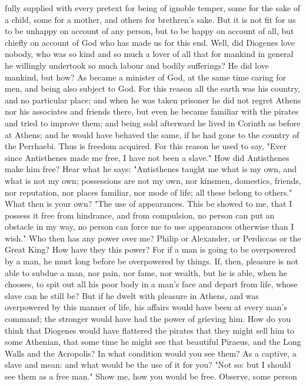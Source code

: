 \documentclass[a4paper]{article}
\begin{document}
fully supplied with every pretext for being of ignoble temper, some for the
sake of a child, some for a mother, and others for brethren's sake. But it is
not fit for us to be unhappy on account of any person, but to be happy on
account of all, but chiefly on account of God who has made us for this end.
Well, did Diogenes love nobody, who was so kind and so much a lover of all that
for mankind in general he willingly undertook so much labour and bodily
sufferings? He did love mankind, but how? As became a minister of God, at the
same time caring for men, and being also subject to God. For this reason all
the earth was his country, and no particular place; and when he was taken
prisoner he did not regret Athens nor his associates and friends there, but
even he became familiar with the pirates and tried to improve them; and being
sold afterward he lived in Corinth as before at Athens; and he would have
behaved the same, if he had gone to the country of the Perrhaebi. Thus is
freedom acquired. For this reason he used to say, "Ever since Antisthenes made
me free, I have not been a slave." How did Antisthenes make him free? Hear what
he says: "Antisthenes taught me what is my own, and what is not my own;
possessions are not my own, nor kinsmen, domestics, friends, nor reputation,
nor places familiar, nor mode of life; all these belong to others." What then
is your own? "The use of appearances. This be showed to me, that I possess it
free from hindrance, and from compulsion, no person can put an obstacle in my
way, no person can force me to use appearances otherwise than I wish." Who then
has any power over me? Philip or Alexander, or Perdiccas or the Great King? How
have they this power? For if a man is going to be overpowered by a man, he must
long before be overpowered by things. If, then, pleasure is not able to subdue
a man, nor pain, nor fame, nor wealth, but he is able, when he chooses, to spit
out all his poor body in a man's face and depart from life, whose slave can he
still be? But if he dwelt with pleasure in Athens, and was overpowered by this
manner of life, his affairs would have been at every man's command; the
stronger would have had the power of grieving him. How do you think that
Diogenes would have flattered the pirates that they might sell him to some
Athenian, that some time he might see that beautiful Piraeus, and the Long
Walls and the Acropolis? In what condition would you see them? As a captive, a
slave and mean: and what would be the use of it for you? "Not so: but I should
see them as a free man." Show me, how you would be free. Observe, some person
\end{document}
